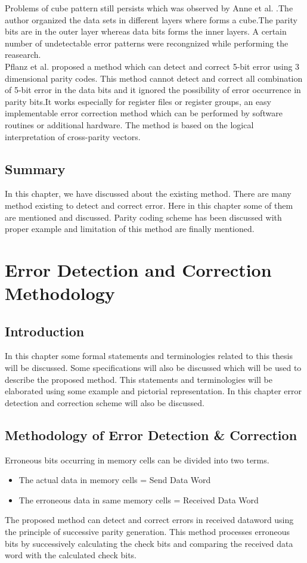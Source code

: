 \documentclass[12pt,a4paper]{report}
\begin{document}
Problems of cube pattern still persists which was observed by Anne et al. \cite{AnneThirunavukkarasuShahramLatifi}.The author organized the data sets in different layers where forms a cube.The parity bits are in the outer layer whereas data bits forms the inner layers. A certain number of undetectable error patterns were recongnized while performing the reasearch.\\

Pflanz et al. \cite{PflanzWaltherGalke} proposed a method which can detect and correct 5-bit error using 3 dimensional parity codes. This method cannot detect and correct all combination of 5-bit error in the data bits and it ignored the possibility of error occurrence in parity bits.It works especially for register files or register groups, an easy implementable error correction method which can be performed by software routines or additional hardware. The method is based on the logical interpretation of cross-parity vectors.

 
 \section{Summary}
 In this chapter, we have discussed about the existing method. There are many method existing to
 detect and correct error. Here in this chapter some of them are mentioned and discussed. Parity
 coding scheme has been discussed with proper example and limitation of this method are finally
 mentioned.
\chapter{Error Detection and Correction Methodology}
\section{Introduction}
 
In this chapter some formal statements and terminologies related to this thesis will be discussed.
Some specifications will also be discussed which will be used to describe the proposed method.
This statements and terminologies will be elaborated using some example and pictorial
representation.
In this chapter error detection and correction scheme will also be discussed.
 \section{Methodology of Error Detection \& Correction}
Erroneous bits occurring in memory cells can be divided into two terms.
\begin{itemize}
\item The actual data in memory cells = Send Data Word
\item The erroneous data in same memory cells = Received Data Word 
\end{itemize}
The proposed method can detect and correct errors in received dataword using the principle of successive parity generation. This method processes erroneous bits by successively calculating the check bits and comparing the received data word with the calculated check bits.\\
\end{document}

